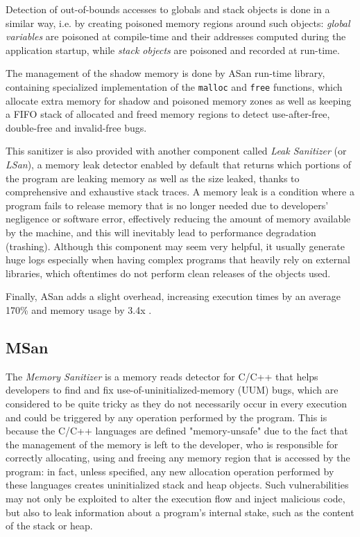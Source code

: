 Detection of out-of-bounds accesses to globals and stack objects is done in a similar way, i.e. by creating poisoned memory regions around such objects: \textit{global variables} are poisoned at compile-time and their addresses computed during the application startup, while \textit{stack objects} are poisoned and recorded at run-time.

The management of the shadow memory is done by ASan run-time library, containing specialized implementation of the \verb|malloc| and \verb|free| functions, which allocate extra memory for shadow and poisoned memory zones as well as keeping a FIFO stack of allocated and freed memory regions to detect use-after-free, double-free and invalid-free bugs.

This sanitizer is also provided with another component called \textit{Leak Sanitizer} (or \textit{LSan}), a memory leak detector enabled by default that returns which portions of the program are leaking memory as well as the size leaked, thanks to comprehensive and exhaustive stack traces. A memory leak is a condition where a program fails to release memory that is no longer needed due to developers' negligence or software error, effectively reducing the amount of memory available by the machine, and this will inevitably lead to performance degradation (trashing). Although this component may seem very helpful, it usually generate huge logs especially when having complex programs that heavily rely on external libraries, which oftentimes do not perform clean releases of the objects used.

Finally, ASan adds a slight overhead, increasing execution times by an average 170\% and memory usage by 3.4x \cite{serebryany2012addresssanitizer}.





\subsection{MSan}
The \textit{Memory Sanitizer} \cite{stepanov2015memorysanitizer} is a memory reads detector for C/C++ that helps developers to find and fix use-of-uninitialized-memory (UUM) bugs, which are considered to be quite tricky as they do not necessarily occur in every execution and could be triggered by any operation performed by the program. This is because the C/C++ languages are defined "memory-unsafe" due to the fact that the management of the memory is left to the developer, who is responsible for correctly allocating, using and freeing any memory region that is accessed by the program: in fact, unless specified, any new allocation operation performed by these languages creates uninitialized stack and heap objects. Such vulnerabilities may not only be exploited to alter the execution flow and inject malicious code, but also to leak information about a program's internal stake, such as the content of the stack or heap.

